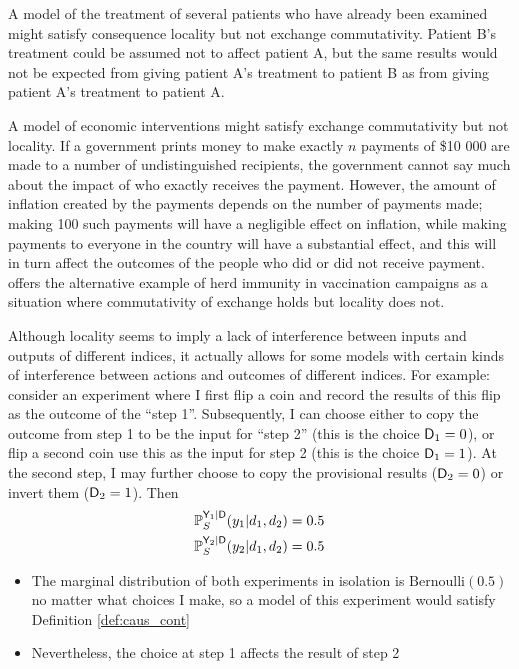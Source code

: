 A model of the treatment of several patients who have already been examined might satisfy consequence locality but not exchange commutativity. Patient B's treatment could be assumed not to affect patient A, but the same results would not be expected from giving patient A's treatment to patient B as from giving patient A's treatment to patient A. 

A model of economic interventions might satisfy exchange commutativity but not locality. If a government prints money to make exactly $n$ payments of \$10 000 are made to a number of undistinguished recipients, the government cannot say much about the impact of who exactly receives the payment. However, the amount of inflation created by the payments depends on the number of payments made; making 100 such payments will have a negligible effect on inflation, while making payments to everyone in the country will have a substantial effect, and this will in turn affect the outcomes of the people who did or did not receive payment. \citet{dawid_causal_2000} offers the alternative example of herd immunity in vaccination campaigns as a situation where commutativity of exchange holds but locality does not.

Although locality seems to imply a lack of interference between inputs and outputs of different indices, it actually allows for some models with certain kinds of interference between actions and outcomes of different indices. For example: consider an experiment where I first flip a coin and record the results of this flip as the outcome of the ``step 1''. Subsequently, I can choose either to copy the outcome from step 1 to be the input for ``step 2'' (this is the choice $\mathsf{D}_1=0$), or flip a second coin use this as the input for step 2 (this is the choice $\mathsf{D}_1=1$). At the second step, I may further choose to copy the provisional results ($\mathsf{D}_2=0$) or invert them ($\mathsf{D}_2=1$). Then
\begin{align}
    \mathbb{P}_S^{\mathsf{Y}_1|\mathsf{D}}(y_1|d_1,d_2) &= 0.5\\
    \mathbb{P}_S^{\mathsf{Y}_2|\mathsf{D}}(y_2|d_1,d_2) &= 0.5
\end{align}
\begin{itemize}
    \item The marginal distribution of both experiments in isolation is $\text{Bernoulli}(0.5)$ no matter what choices I make, so a model of this experiment would satisfy Definition \ref{def:caus_cont}
    \item Nevertheless, the choice at step 1 affects the result of step 2
\end{itemize}

